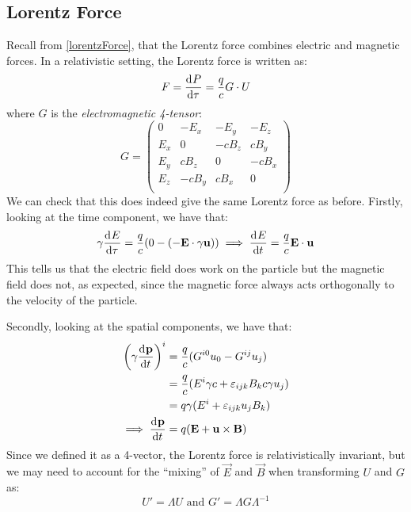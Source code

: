 \documentclass[../main.tex]{subfiles}
\begin{document}
\subsection{Lorentz Force}
\nonexaminable
Recall from \cref{lorentzForce}, that the Lorentz force combines electric and magnetic forces.
In a relativistic setting, the Lorentz force is written as:
\[
  F = \deriv{P}{\tau} = \frac{q}{c} G \cdot U
\]
where $G$ is the \textit{electromagnetic 4-tensor}:
\[
  G = \begin{pmatrix}
  0 & -E_{x} & -E_{y} & -E_{z} \\
  E_x & 0 & -cB_z & cB_y \\
  E_y & cB_z & 0 & -cB_x \\
  E_z & -cB_y & cB_x & 0 \\
  \end{pmatrix}
\]
We can check that this does indeed give the same Lorentz force as before.
Firstly, looking at the time component, we have that:
\begin{align*}
  \gamma \deriv{E}{\tau} = \frac{q}{c}(0 - (-\vec{E} \cdot \gamma \vec{u})) \implies \deriv{E}{t} = \frac{q}{c}\vec{E} \cdot \vec{u}
\end{align*}
This tells us that the electric field does work on the particle but the magnetic field does not, as expected, since the magnetic force always acts orthogonally to the velocity of the particle.

Secondly, looking at the spatial components, we have that:
\begin{align*}
  \left(\gamma \deriv{\vec{p}}{t}\right)^{i} &= \frac{q}{c}(G^{i0}u_0 - G^{ij}u_j) \\
                                       &= \frac{q}{c}(E^{i}\gamma c + \levi_{i j k}B_k c \gamma u_j) \\
                                       &= q\gamma(E^{i} + \levi_{i j k}u_jB_k) \\
  \implies \deriv{\vec{p}}{t} &= q(\vec{E} + \vec{u} \times \vec{B})
\end{align*}
Since we defined it as a 4-vector, the Lorentz force is relativistically invariant, but we may need to account for the ``mixing'' of $\vec{E}$ and $\vec{B}$ when transforming $U$ and $G$ as:
\[
  U' = \Lambda U \text{ and } G' = \Lambda G \Lambda^{-1}
\]
\end{document}
